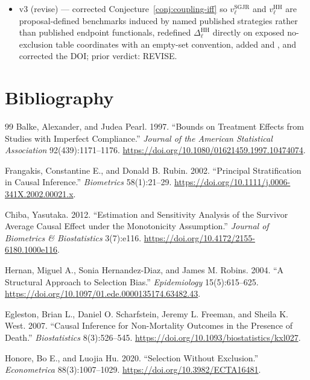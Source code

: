 \documentclass[11pt]{article}
\theoremstyle{definition}
\theoremstyle{plain}
\theoremstyle{remark}
\begin{document}
\begin{itemize}[leftmargin=*]
\item v3 (revise) --- corrected Conjecture~\ref{conj:coupling-iff} so \(v_\ell^{\mathrm{SGJR}}\) and \(v_\ell^{\mathrm{HH}}\) are proposal-defined benchmarks induced by named published strategies rather than published endpoint functionals, redefined \(\Delta_\ell^{\mathrm{HH}}\) directly on exposed no-exclusion table coordinates with an empty-set convention, added \citet{Imai2008TruncationDeath} and \citet{Chiba2012SACE}, and corrected the \citet{HonoreHu2020Selection} DOI; prior verdict: REVISE.
\end{itemize}

\section*{Bibliography}
\begin{thebibliography}{99}
Balke, Alexander, and Judea Pearl. 1997. ``Bounds on Treatment Effects from Studies with Imperfect Compliance.'' \emph{Journal of the American Statistical Association} 92(439):1171--1176. \url{https://doi.org/10.1080/01621459.1997.10474074}.

Frangakis, Constantine E., and Donald B. Rubin. 2002. ``Principal Stratification in Causal Inference.'' \emph{Biometrics} 58(1):21--29. \url{https://doi.org/10.1111/j.0006-341X.2002.00021.x}.

Chiba, Yasutaka. 2012. ``Estimation and Sensitivity Analysis of the Survivor Average Causal Effect under the Monotonicity Assumption.'' \emph{Journal of Biometrics \& Biostatistics} 3(7):e116. \url{https://doi.org/10.4172/2155-6180.1000e116}.

Hernan, Miguel A., Sonia Hernandez-Diaz, and James M. Robins. 2004. ``A Structural Approach to Selection Bias.'' \emph{Epidemiology} 15(5):615--625. \url{https://doi.org/10.1097/01.ede.0000135174.63482.43}.

Egleston, Brian L., Daniel O. Scharfstein, Jeremy L. Freeman, and Sheila K. West. 2007. ``Causal Inference for Non-Mortality Outcomes in the Presence of Death.'' \emph{Biostatistics} 8(3):526--545. \url{https://doi.org/10.1093/biostatistics/kxl027}.

Honore, Bo E., and Luojia Hu. 2020. ``Selection Without Exclusion.'' \emph{Econometrica} 88(3):1007--1029. \url{https://doi.org/10.3982/ECTA16481}.


\end{thebibliography}
\end{document}
